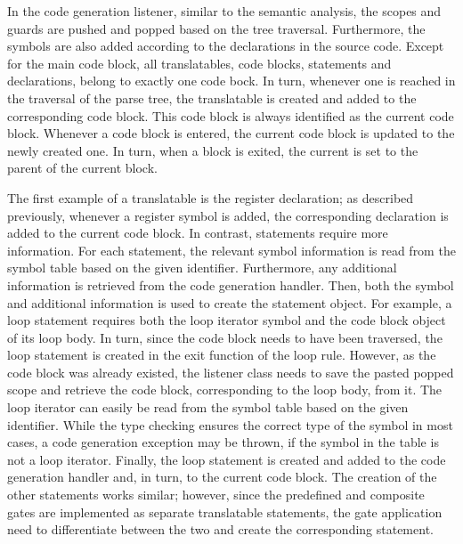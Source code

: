 In the code generation listener, similar to the semantic analysis, the scopes and guards are pushed and popped based on the tree traversal. Furthermore, the symbols are also added according to the declarations in the source code. Except for the main code block, all translatables, \ie code blocks, statements and declarations, belong to exactly one code bock. In turn, whenever one is reached in the traversal of the parse tree, the translatable is created and added to the corresponding code block. This code block is always identified as the current code block. Whenever a code block is entered, the current code block is updated to the newly created one. In turn, when a block is exited, the current is set to the parent of the current block.

The first example of a translatable is the register declaration; as described previously, whenever a register symbol is added, the corresponding declaration is added to the current code block. In contrast, statements require more information. For each statement, the relevant symbol information is read from the symbol table based on the given identifier. Furthermore, any additional information is retrieved from the code generation handler. Then, both the symbol and additional information is used to create the statement object. For example, a loop statement requires both the loop iterator symbol and the code block object of its loop body. In turn, since the code block needs to have been traversed, the loop statement is created in the exit function of the loop rule. However, as the code block was already existed, the listener class needs to save the pasted popped scope and retrieve the code block, corresponding to the loop body, from it. The loop iterator can easily be read from the symbol table based on the given identifier. While the type checking ensures the correct type of the symbol in most cases, a code generation exception may be thrown, if the symbol in the table is not a loop iterator. Finally, the loop statement is created and added to the code generation handler and, in turn, to the current code block. The creation of the other statements works similar; however, since the predefined and composite gates are implemented as separate translatable statements, the gate application need to differentiate between the two and create the corresponding statement.

